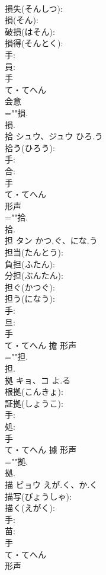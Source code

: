 \documentclass[8pt]{extreport}
\begin{document}
\begin{CJK}{UTF8}{min}
\\	損失(そんしつ): 
\\	損(そん): 
\\	破損(はそん): 
\\	損得(そんとく): 
\\	手: 
\\	員: 
\\	手	
\\	て・てへん	
\\	会意 
\\	=""損.
\\	損.
\\	拾	シュウ、ジュウ	ひろ.う		
\\	拾う(ひろう): 
\\	手: 
\\	合: 
\\	手	
\\	て・てへん	
\\	形声 
\\	=""拾.
\\	拾.
\\	担	タン	かつ.ぐ、にな.う		
\\	担当(たんとう): 
\\	負担(ふたん): 
\\	分担(ぶんたん): 
\\	担ぐ(かつぐ): 
\\	担う(になう): 
\\	手: 
\\	旦: 
\\	手	
\\	て・てへん	擔	形声 
\\	=""担.
\\	担.
\\	拠	キョ、コ	よ.る		
\\	根拠(こんきょ): 
\\	証拠(しょうこ): 
\\	手: 
\\	処: 
\\	手	
\\	て・てへん	據	形声 
\\	=""拠.
\\	拠.
\\	描	ビョウ	えが.く、か.く		
\\	描写(びょうしゃ): 
\\	描く(えがく): 
\\	手: 
\\	苗: 
\\	手	
\\	て・てへん	
\\	形声 

\end{CJK}
\end{document}

